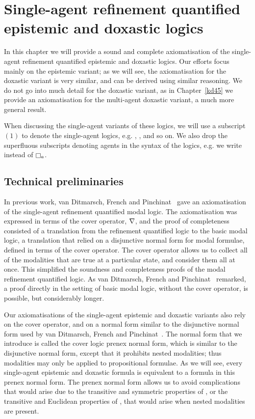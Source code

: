 \chapter{Single-agent refinement quantified epistemic and doxastic logics}\label{single}

In this chapter we will provide a sound and complete axiomatisation of the
single-agent refinement quantified epistemic and doxastic logics.  Our efforts
focus mainly on the epistemic variant; as we will see, the axiomatisation for
the doxastic variant is very similar, and can be derived using similar
reasoning. We do not go into much detail for the doxastic variant, as in
Chapter~\ref{kd45} we provide an axiomatisation for the multi-agent doxastic
variant, a much more general result.

When discussing the single-agent variants of these logics, we will use a
subscript $(1)$ to denote the single-agent logics, e.g. \logicSi{}, \logicSiF{},
and so on. We also drop the superfluous subscripts denoting agents in the syntax
of the logics, e.g. we write \knows{} instead of $\knows_a$.

\section{Technical preliminaries}

In previous work, van Ditmarsch, French and Pinchinat~\cite{french2010future}
gave an axiomatisation of the single-agent refinement quantified modal logic.
The axiomatisation was expressed in terms of the cover operator, $\nabla$, and
the proof of completeness consisted of a translation from the refinement
quantified logic to the basic modal logic, a translation that relied on a
disjunctive normal form for modal formulae, defined in terms of the cover
operator. The cover operator allows us to collect all of the modalities that are
true at a particular state, and consider them all at once. This simplified the
soundness and completeness proofs of the modal refinement quantified logic. As
van Ditmarsch, French and Pinchinat~\cite{french2010future} remarked, a proof
directly in the setting of basic modal logic, without the cover operator, is
possible, but considerably longer.

Our axiomatisations of the single-agent epistemic and doxastic variants also
rely on the cover operator, and on a normal form similar to the disjunctive
normal form used by van Ditmarsch, French and Pinchinat~\cite{french2010future}.
The normal form that we introduce is called the cover logic prenex normal form,
which is similar to the disjunctive normal form, except that it prohibits nested
modalities; thus modalities may only be applied to propositional formulae. As we
will see, every single-agent epistemic and doxastic formula is equivalent to a
formula in this prenex normal form. The prenex normal form allows us to avoid
complications that would arise due to the transitive and symmetric properties of
\classS{}, or the transitive and Euclidean properties of \classKD{}, that would
arise when nested modalities are present.

